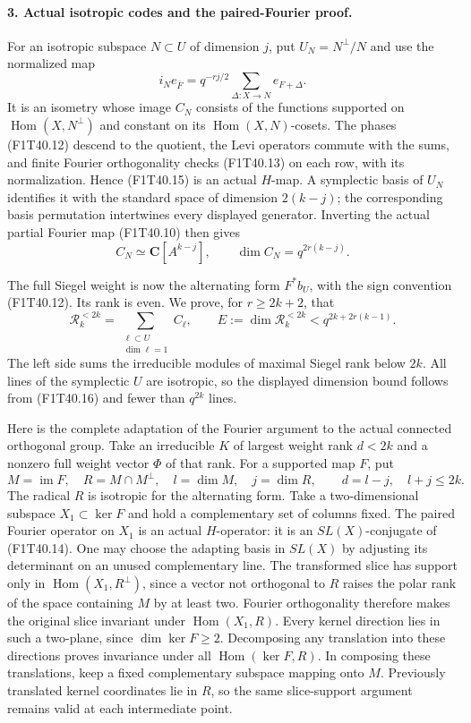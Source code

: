 \paragraph{3. Actual isotropic codes and the paired-Fourier proof.}
For an isotropic subspace \(N\subset U\) of dimension
\(j\), put \(U_N=N^\perp/N\) and use the normalized map
\[
 i_N e_{\bar F}=q^{-rj/2}\sum_{\Delta:X\to N}e_{F+\Delta}.
 \tag{F1T40.15}
\]
It is an isometry whose image \(C_N\) consists of the
functions supported on \(\operatorname{Hom}(X,N^\perp)\)
and constant on its \(\operatorname{Hom}(X,N)\)-cosets.
The phases (F1T40.12) descend to the quotient, the Levi
operators commute with the sums, and finite Fourier
orthogonality checks (F1T40.13) on each row, with its
normalization. Hence (F1T40.15) is an actual \(H\)-map.
A symplectic basis of \(U_N\) identifies it with the
standard space of dimension \(2(k-j)\); the corresponding
basis permutation intertwines every displayed generator.
Inverting the actual partial Fourier map (F1T40.10) then gives
\[
                  C_N\simeq\mathbf C[A^{k-j}],
                  \qquad\dim C_N=q^{2r(k-j)}.
 \tag{F1T40.16}
\]

The full Siegel weight is now the alternating form
\(F^*b_U\), with the sign convention (F1T40.12).
Its rank is even. We prove, for \(r\ge2k+2\), that
\[
 \mathcal R_k^{<2k}=\sum_{\substack{\ell\subset U\\\dim\ell=1}}C_\ell,
       \qquad E:=\dim\mathcal R_k^{<2k}<q^{2k+2r(k-1)}.
 \tag{F1T40.17}
\]
The left side sums the irreducible modules of maximal
Siegel rank below \(2k\). All lines of the symplectic
\(U\) are isotropic, so the displayed dimension bound
follows from (F1T40.16) and fewer than \(q^{2k}\) lines.

Here is the complete adaptation of the Fourier argument
to the actual connected orthogonal group. Take an
irreducible \(K\) of largest weight rank \(d<2k\)
and a nonzero full weight vector \(\Phi\) of that rank.
For a supported map \(F\), put
\[
 M=\operatorname{im}F,\quad R=M\cap M^\perp,
 \quad l=\dim M,\quad j=\dim R,
 \qquad d=l-j,\quad l+j\le2k.
 \tag{F1T40.18}
\]
The radical \(R\) is isotropic for the alternating form.
Take a two-dimensional subspace \(X_1\subset\ker F\)
and hold a complementary set of columns fixed.
The paired Fourier operator on \(X_1\) is an actual
\(H\)-operator: it is an \(SL(X)\)-conjugate of
(F1T40.14). One may choose the adapting basis in \(SL(X)\)
by adjusting its determinant on an unused complementary
line. The transformed slice has support only in
\(\operatorname{Hom}(X_1,R^\perp)\), since a vector
not orthogonal to \(R\) raises the polar rank of the
space containing \(M\) by at least two.
Fourier orthogonality therefore makes the original slice
invariant under \(\operatorname{Hom}(X_1,R)\).
Every kernel direction lies in such a two-plane, since
\(\dim\ker F\ge2\). Decomposing any translation into
these directions proves invariance under all
\(\operatorname{Hom}(\ker F,R)\). In composing these
translations, keep a fixed complementary subspace mapping
onto \(M\). Previously translated kernel coordinates lie
in \(R\), so the same slice-support argument remains
valid at each intermediate point.

